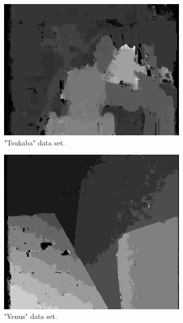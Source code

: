 \documentclass[12pt,a4paper,oneside,final]{article}
\begin{document}
\begin{figure}[H]
\begin{subfigure}[b]{0.32\textwidth}
	\includegraphics[width=\textwidth]{disparity_s4_k11set_1.png}
	\caption{"Tsukaba" data set.}
\end{subfigure}
\begin{subfigure}[b]{0.32\textwidth}
	\includegraphics[width=\textwidth]{disparity_s4_k11set_2.png}
	\caption{"Venus" data set.}
\end{subfigure}
\begin{subfigure}[b]{0.32\textwidth}

\end{subfigure}
\end{figure}
\end{document}
